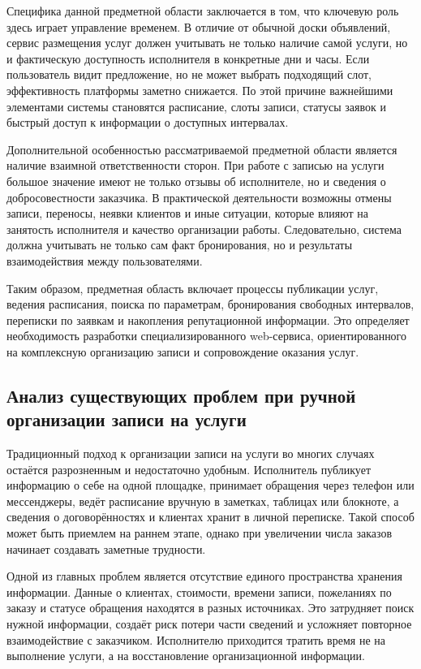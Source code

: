 Специфика данной предметной области заключается в том, что ключевую роль здесь играет управление временем. В отличие от обычной доски объявлений, сервис размещения услуг должен учитывать не только наличие самой услуги, но и фактическую доступность исполнителя в конкретные дни и часы. Если пользователь видит предложение, но не может выбрать подходящий слот, эффективность платформы заметно снижается. По этой причине важнейшими элементами системы становятся расписание, слоты записи, статусы заявок и быстрый доступ к информации о доступных интервалах.

Дополнительной особенностью рассматриваемой предметной области является наличие взаимной ответственности сторон. При работе с записью на услуги большое значение имеют не только отзывы об исполнителе, но и сведения о добросовестности заказчика. В практической деятельности возможны отмены записи, переносы, неявки клиентов и иные ситуации, которые влияют на занятость исполнителя и качество организации работы. Следовательно, система должна учитывать не только сам факт бронирования, но и результаты взаимодействия между пользователями.

Таким образом, предметная область включает процессы публикации услуг, ведения расписания, поиска по параметрам, бронирования свободных интервалов, переписки по заявкам и накопления репутационной информации. Это определяет необходимость разработки специализированного web-сервиса, ориентированного на комплексную организацию записи и сопровождение оказания услуг.

\subsection{Анализ существующих проблем при ручной организации записи на услуги}

Традиционный подход к организации записи на услуги во многих случаях остаётся разрозненным и недостаточно удобным. Исполнитель публикует информацию о себе на одной площадке, принимает обращения через телефон или мессенджеры, ведёт расписание вручную в заметках, таблицах или блокноте, а сведения о договорённостях и клиентах хранит в личной переписке. Такой способ может быть приемлем на раннем этапе, однако при увеличении числа заказов начинает создавать заметные трудности.

Одной из главных проблем является отсутствие единого пространства хранения информации. Данные о клиентах, стоимости, времени записи, пожеланиях по заказу и статусе обращения находятся в разных источниках. Это затрудняет поиск нужной информации, создаёт риск потери части сведений и усложняет повторное взаимодействие с заказчиком. Исполнителю приходится тратить время не на выполнение услуги, а на восстановление организационной информации.

